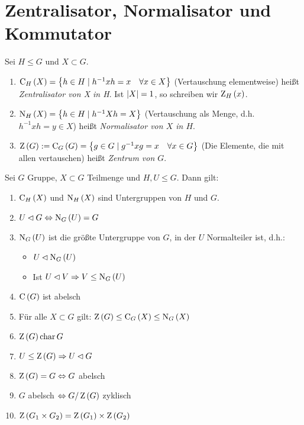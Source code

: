 \section{Zentralisator, Normalisator und Kommutator}

\begin{definition}
 \label{zentralisator_normalisator_zentrum}
 Sei $H \leq G$ und $X \subset G$.
 \begin{enumerate}
  \item $\operatorname{C}_H \left( X \right) = \left\{ h \in H \mid h^{-1}xh=x \quad \forall x \in X \right\}$ (Vertauschung elementweise) hei\ss{}t \emph{Zentralisator von X in H}. Ist $\left| X \right| = 1$, so schreiben wir $\operatorname{Z}_H \left( x \right)$.
  \item $\operatorname{N}_H\left(X\right)=\left\{h\in H\mid h^{-1}Xh=X\right\}$ (Vertauschung als Menge, d.h.  $h^{-1}xh=y\in X$) hei\ss{}t \emph{Normalisator von $X$ in $H$}.
  \item $\operatorname{Z} \left( G \right) := \operatorname{C}_G\left( G \right) = \left\{ g \in G \mid g^{-1} x g = x \quad \forall x \in G \right\}$ (Die Elemente, die mit allen vertauschen) hei\ss{}t \emph{Zentrum von $G$}.
 \end{enumerate}
\end{definition}

\begin{satz}
 \label{aussagen_zu_ugr}
 Sei $G$ Gruppe, $X \subset G$ Teilmenge und $H, U \leq G$. Dann gilt:
 \begin{enumerate}
  \item $\operatorname{C}_H\left(X\right)$ und $\operatorname{N}_H\left(X\right)$ sind Untergruppen von $H$ und $G$.
  \item $U \lhd G \Leftrightarrow \operatorname{N}_G\left( U \right) = G$
  \item $\operatorname{N}_G\left(U\right)$ ist die gr\"o\ss{}te Untergruppe von $G$, in der $U$ Normalteiler ist, d.h.:
   \begin{itemize}
    \item $U \lhd \operatorname{N}_G\left(U\right)$
    \item Ist $U \lhd V \Rightarrow V \leq \operatorname{N}_G\left(U\right)$
   \end{itemize}
  \item $\operatorname{C}\left(G\right)$ ist abelsch
  \item F\"ur alle $X \subset G$ gilt: $\operatorname{Z}\left(G\right) \leq \operatorname{C}_G\left(X\right) \leq \operatorname{N}_G\left(X\right)$
  \item $\operatorname{Z}\left(G\right) \operatorname{char} G$
  \item \label{ugr_zen_nt} $U \leq \operatorname{Z}\left(G\right) \Rightarrow U \lhd G$
  \item $\operatorname{Z}\left(G\right) = G \Leftrightarrow G$ abelsch
  \item $G$ abelsch $\Leftrightarrow G/\operatorname{Z}\left(G\right) $ zyklisch
  \item $\operatorname{Z}\left(G_1 \times G_2\right) = \operatorname{Z}\left(G_1\right) \times \operatorname{Z}\left(G_2\right)$
 \end{enumerate}
\end{satz}


